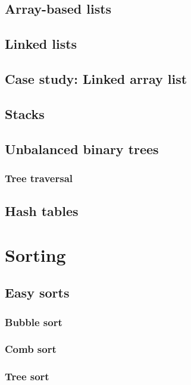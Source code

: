 \documentclass[oneside]{book}
\begin{document}
\section{Array-based lists}

\section{Linked lists}

\section{Case study: Linked array list}

\section{Stacks}

\section{Unbalanced binary trees}

\subsection{Tree traversal}

\section{Hash tables}

\chapter{Sorting}

\section{Easy sorts}

\subsection{Bubble sort}

\subsection{Comb sort}

\subsection{Tree sort}
\end{document}
